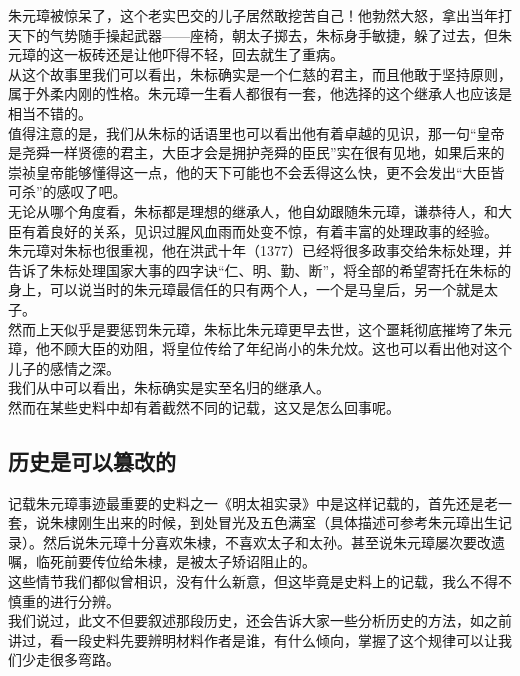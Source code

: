 \begin{multicols}{\theparacolNo}
朱元璋被惊呆了，这个老实巴交的儿子居然敢挖苦自己！他勃然大怒，拿出当年打天下的气势随手操起武器——座椅，朝太子掷去，朱标身手敏捷，躲了过去，但朱元璋的这一板砖还是让他吓得不轻，回去就生了重病。\\

从这个故事里我们可以看出，朱标确实是一个仁慈的君主，而且他敢于坚持原则，属于外柔内刚的性格。朱元璋一生看人都很有一套，他选择的这个继承人也应该是相当不错的。\\

值得注意的是，我们从朱标的话语里也可以看出他有着卓越的见识，那一句“皇帝是尧舜一样贤德的君主，大臣才会是拥护尧舜的臣民”实在很有见地，如果后来的崇祯皇帝能够懂得这一点，他的天下可能也不会丢得这么快，更不会发出“大臣皆可杀”的感叹了吧。\\

无论从哪个角度看，朱标都是理想的继承人，他自幼跟随朱元璋，谦恭待人，和大臣有着良好的关系，见识过腥风血雨而处变不惊，有着丰富的处理政事的经验。\\

朱元璋对朱标也很重视，他在洪武十年（1377）已经将很多政事交给朱标处理，并告诉了朱标处理国家大事的四字诀“仁、明、勤、断”，将全部的希望寄托在朱标的身上，可以说当时的朱元璋最信任的只有两个人，一个是马皇后，另一个就是太子。\\

然而上天似乎是要惩罚朱元璋，朱标比朱元璋更早去世，这个噩耗彻底摧垮了朱元璋，他不顾大臣的劝阻，将皇位传给了年纪尚小的朱允炆。这也可以看出他对这个儿子的感情之深。\\

我们从中可以看出，朱标确实是实至名归的继承人。\\

然而在某些史料中却有着截然不同的记载，这又是怎么回事呢。\\

\subsection{历史是可以篡改的}
记载朱元璋事迹最重要的史料之一《明太祖实录》中是这样记载的，首先还是老一套，说朱棣刚生出来的时候，到处冒光及五色满室（具体描述可参考朱元璋出生记录）。然后说朱元璋十分喜欢朱棣，不喜欢太子和太孙。甚至说朱元璋屡次要改遗嘱，临死前要传位给朱棣，是被太子矫诏阻止的。\\

这些情节我们都似曾相识，没有什么新意，但这毕竟是史料上的记载，我么不得不慎重的进行分辨。\\

我们说过，此文不但要叙述那段历史，还会告诉大家一些分析历史的方法，如之前讲过，看一段史料先要辨明材料作者是谁，有什么倾向，掌握了这个规律可以让我们少走很多弯路。\\


\end{multicols}

